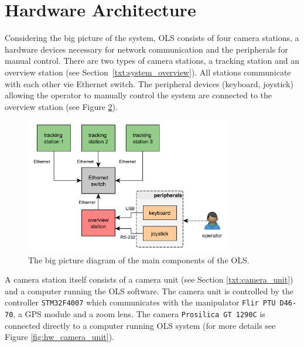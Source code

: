 \begin{figure}[htb]
\begin{minipage}{.48\textwidth}
		\label{fig:spilberk_camera_units}
	\end{minipage}
\end{figure}

\section{Hardware Architecture}

Considering the big picture of the system, OLS consists of four camera stations, a hardware devices necessary for network communication and the peripherals for manual control. There are two types of camera stations, a tracking station and an overview station (see Section~\ref{txt:system_overview}). All stations communicate with each other vie Ethernet switch. The peripheral devices (keyboard, joystick) allowing the operator to manually control the system are connected to the overview station (see Figure \ref{fig:hw_ols}).

\begin{figure}[htb]
	\centering
	\includegraphics[width=9cm]{fig/hw_ols.pdf}
	\caption{The big picture diagram of the main components of the OLS.}
	\label{fig:hw_ols}
\end{figure}

A camera station itself consists of a camera unit (see Section \ref{txt:camera_unit}) and a computer running the OLS software. The camera unit is controlled by the controller \texttt{STM32F4007} which communicates with the manipulator \texttt{Flir PTU D46-70}, a GPS module and a zoom lens. The camera \texttt{Prosilica GT 1290C} is connected directly to a computer running OLS system (for more details see Figure \ref{fig:hw_camera_unit}).

